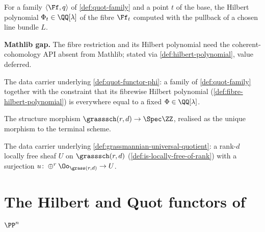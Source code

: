 \begin{definition}
  \label{def:fibre-hilbert-polynomial}
  For a family $\langle\Ff,q\rangle$ of \cref{def:quot-family} and a point $t$ of
  the base, the Hilbert polynomial $\Phi_t\in\QQ[\lambda]$ of the fibre $\Ff_t$
  computed with the pullback of a chosen line bundle $L$.

  \textbf{Mathlib gap.} The fibre restriction and its Hilbert polynomial need the
  coherent-cohomology API absent from Mathlib; stated via
  \cref{def:hilbert-polynomial}, value deferred.
\end{definition}

\begin{definition}
  \label{def:quot-family-phi}
  The data carrier underlying \cref{def:quot-functor-phi}: a family of
  \cref{def:quot-family} together with the constraint that its fibrewise Hilbert
  polynomial (\cref{def:fibre-hilbert-polynomial}) is everywhere equal to a fixed
  $\Phi\in\QQ[\lambda]$.
\end{definition}

\begin{definition}
  \label{def:grassmannian-structure-morphism}
  The structure morphism $\grasssch(r,d)\to\Spec\ZZ$, realised as the unique
  morphism to the terminal scheme.
\end{definition}

\begin{definition}
  \label{def:grassmannian-tautological}
  The data carrier underlying \cref{def:grassmannian-universal-quotient}: a
  rank-$d$ locally free sheaf $U$ on $\grasssch(r,d)$
  (\cref{def:is-locally-free-of-rank}) with a surjection
  $u\colon\oplus^r\Oo_{\grass(r,d)}\to U$.
\end{definition}

\section{The Hilbert and Quot functors of $\PP^n$}


